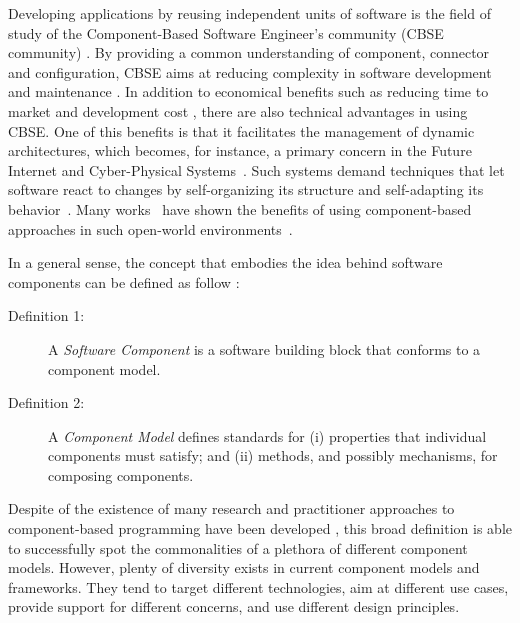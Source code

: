 Developing applications by reusing independent units of software is the field of study of the Component-Based Software Engineer's community (CBSE community) \cite{cbse-conference}.
By providing a common understanding of component, connector and configuration, CBSE aims at reducing complexity in software development and maintenance \cite{xadl,Medvidovic:2000,VanOmmering-et-al-00}.
In addition to economical benefits such as reducing time to market and development cost \cite{SZYPERSKI2002}, there are also technical advantages in using CBSE. 
One of this benefits is that it facilitates the management of dynamic architectures, which becomes, for instance, a primary concern in the Future Internet and Cyber-Physical Systems~\cite{DBLP:journals/ase/NittoGMPP08, Johnson:2015:CSM:2735960.2735979}.
Such systems demand techniques that let software react to changes by self-organizing its structure and self-adapting its behavior~\cite{PanzicaLaManna:2012:LDU:2304736.2304764, Johnson:2015:CSM:2735960.2735979, Zhang:2009:MVD:1509239.1509262}.
Many works~\cite{cbse-conference} have shown the benefits of using component-based approaches in such open-world environments~\cite{baresi2006toward, Caporuscio:2010:AIA:1985522.1985547, Perez-Palacin:2010:PAO:1712605.1712614}.

In a general sense, the concept that embodies the idea behind software components can be defined as follow
\cite{Crnkovic2011}:

\begin{description}
\item[Definition 1:] A \textit{Software Component} is a software building block that conforms to a component model. 
\item[Definition 2:] A \textit{Component Model} defines standards for (i) properties that individual components must satisfy; and (ii) methods, and possibly mechanisms, for composing components.
\end{description}

Despite of the existence of many research and practitioner approaches to component-based programming have been developed \cite{Heineman2001, SZYPERSKI2002, Crnkovic2011}, this broad definition is able to successfully spot the commonalities of a plethora of different component models.
However, plenty of diversity exists in current component models and frameworks.
They tend to target different technologies, aim at different use cases, provide support for different concerns, and use different design principles.

